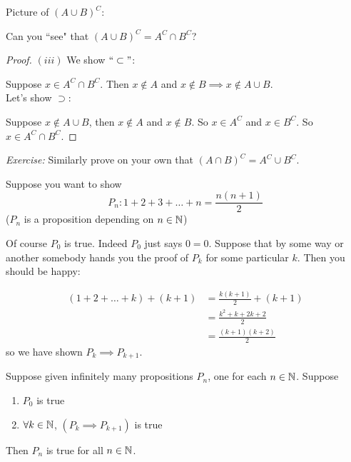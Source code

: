 \documentclass[twoside]{scrartcl}
\begin{document}
Picture of $(A\cup B)^C$:
\begin{center}
\end{center}

Can you ``see" that $(A\cup B)^C = A^C \cap B^C$?

\begin{proof} $(iii)$ We show $``\subset"$: 

Suppose $x \in A^C \cap B^C$. Then $x \not \in A$ and $x \not \in B \implies x \not \in A\cup B$.\\

Let's show $\supset$: 

Suppose $x \not \in A\cup B$, then $x \not \in A $ and $x \not \in B$. So $x \in A^C$ and $x \in B^C$. So $x \in A^C \cap B^C$. 
\end{proof}

\emph{Exercise:} Similarly prove on your own that $(A\cap B)^C = A^C \cup B^C$. 
\pagebreak





Suppose you want to show
\[P_n: 1 + 2 + 3 + \dots + n = \frac{n(n+1)}{2}\]
($P_n$ is a proposition depending on $n\in\mathbb{N}$)

Of course $P_0$ is true. Indeed $P_0$ just says $0 = 0$. Suppose that by some way or another somebody hands you the proof of $P_k$ for some particular $k$. Then you should be happy: 

\[\begin{aligned}
(1+2+\dots + k) + (k+1) &= \frac{k(k+1)}{2} + (k+1)\\
&= \frac{k^2 + k + 2k + 2}{2}\\
&= \frac{(k+1)(k+2)}{2}	
\end{aligned}
\]
so we have shown $P_k \implies P_{k+1}$.\\


\begin{definition}
Suppose given infinitely many propositions $P_n$, one for each $n \in\mathbb{N}$. Suppose \vspace*{5pt}
\begin{enumerate}
\item $P_0$ is true
\item $\forall k\in\mathbb{N}$, $(P_k \implies P_{k+1})$ is true	
\end{enumerate}

Then $P_n$ is true for all $n\in\mathbb{N}$. 
\end{definition}
\end{document}
